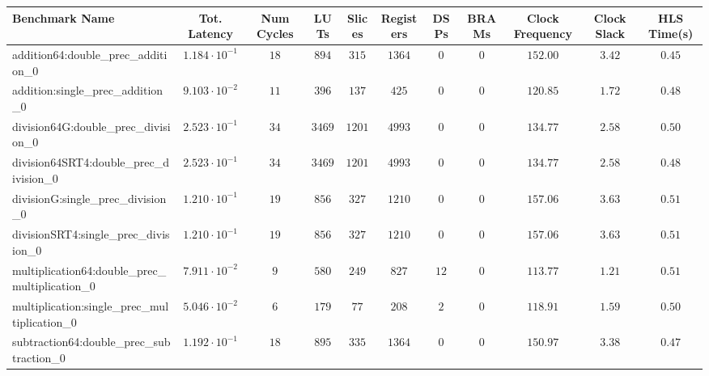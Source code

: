 \begin{tabular}{|l|c|c|c|c|c|c|c|c|c|c|}
\hline
Benchmark Name                                   & Tot. Latency            & Num Cycles & LUTs      & Slices   & Registers & DSPs   & BRAMs & Clock Frequency & Clock Slack & HLS Time(s) \\
\hline
addition64:double\_prec\_addition\_0             & $ 1.184 \cdot 10^{-1} $ & $ 18     $ & $ 894   $ & $ 315  $ & $ 1364  $ & $ 0  $ & $ 0 $ & $ 152.00      $ & $ 3.42    $ & $ 0.45    $ \\
addition:single\_prec\_addition\_0               & $ 9.103 \cdot 10^{-2} $ & $ 11     $ & $ 396   $ & $ 137  $ & $ 425   $ & $ 0  $ & $ 0 $ & $ 120.85      $ & $ 1.72    $ & $ 0.48    $ \\
division64G:double\_prec\_division\_0            & $ 2.523 \cdot 10^{-1} $ & $ 34     $ & $ 3469  $ & $ 1201 $ & $ 4993  $ & $ 0  $ & $ 0 $ & $ 134.77      $ & $ 2.58    $ & $ 0.50    $ \\
division64SRT4:double\_prec\_division\_0         & $ 2.523 \cdot 10^{-1} $ & $ 34     $ & $ 3469  $ & $ 1201 $ & $ 4993  $ & $ 0  $ & $ 0 $ & $ 134.77      $ & $ 2.58    $ & $ 0.48    $ \\
divisionG:single\_prec\_division\_0              & $ 1.210 \cdot 10^{-1} $ & $ 19     $ & $ 856   $ & $ 327  $ & $ 1210  $ & $ 0  $ & $ 0 $ & $ 157.06      $ & $ 3.63    $ & $ 0.51    $ \\
divisionSRT4:single\_prec\_division\_0           & $ 1.210 \cdot 10^{-1} $ & $ 19     $ & $ 856   $ & $ 327  $ & $ 1210  $ & $ 0  $ & $ 0 $ & $ 157.06      $ & $ 3.63    $ & $ 0.51    $ \\
multiplication64:double\_prec\_multiplication\_0 & $ 7.911 \cdot 10^{-2} $ & $ 9      $ & $ 580   $ & $ 249  $ & $ 827   $ & $ 12 $ & $ 0 $ & $ 113.77      $ & $ 1.21    $ & $ 0.51    $ \\
multiplication:single\_prec\_multiplication\_0   & $ 5.046 \cdot 10^{-2} $ & $ 6      $ & $ 179   $ & $ 77   $ & $ 208   $ & $ 2  $ & $ 0 $ & $ 118.91      $ & $ 1.59    $ & $ 0.50    $ \\
subtraction64:double\_prec\_subtraction\_0       & $ 1.192 \cdot 10^{-1} $ & $ 18     $ & $ 895   $ & $ 335  $ & $ 1364  $ & $ 0  $ & $ 0 $ & $ 150.97      $ & $ 3.38    $ & $ 0.47    $ \\

\end{tabular}

